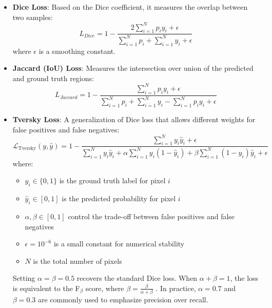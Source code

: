 \documentclass[review]{elsarticle}
\begin{document}
\begin{itemize}
    \item \textbf{Dice Loss}: Based on the Dice coefficient, it measures the overlap between two samples:
    \begin{equation}\label{dice-loss}
        L_{Dice} = 1 - \frac{2\sum_{i=1}^{N} p_i y_i + \epsilon}{\sum_{i=1}^{N} p_i + \sum_{i=1}^{N} y_i + \epsilon}
    \end{equation}
    where $\epsilon$ is a smoothing constant.

    \item \textbf{Jaccard (IoU) Loss}: Measures the intersection over union of the predicted and ground truth regions:
    \begin{equation}\label{iou-loss}
        L_{Jaccard} = 1 - \frac{\sum_{i=1}^{N} p_i y_i + \epsilon}{\sum_{i=1}^{N} p_i + \sum_{i=1}^{N} y_i - \sum_{i=1}^{N} p_i y_i + \epsilon}
    \end{equation}

    \item \textbf{Tversky Loss}: A generalization of Dice loss that allows different weights for false positives and false negatives:
    \begin{equation}\label{tversky-loss}
        \mathcal{L}_{\text{Tversky}}(y, \hat{y}) = 1 - \frac{\sum_{i=1}^N y_i \hat{y}_i + \epsilon}{\sum_{i=1}^N y_i \hat{y}_i + \alpha \sum_{i=1}^N y_i (1 - \hat{y}_i) + \beta \sum_{i=1}^N (1 - y_i) \hat{y}_i + \epsilon}
    \end{equation}
    where:
    \begin{itemize}
        \item $y_i \in \{0,1\}$ is the ground truth label for pixel $i$
        \item $\hat{y}_i \in [0,1]$ is the predicted probability for pixel $i$
        \item $\alpha, \beta \in [0,1]$ control the trade-off between false positives and false negatives
        \item $\epsilon = 10^{-6}$ is a small constant for numerical stability
        \item $N$ is the total number of pixels
    \end{itemize}
    Setting $\alpha = \beta = 0.5$ recovers the standard Dice loss. When $\alpha + \beta = 1$, the loss is equivalent to the F$_\beta$ score, where $\beta = \frac{\beta}{\alpha + \beta}$ \cite{salehi2017tversky}. In practice, $\alpha = 0.7$ and $\beta = 0.3$ are commonly used to emphasize precision over recall.
\end{itemize}
\end{document}
